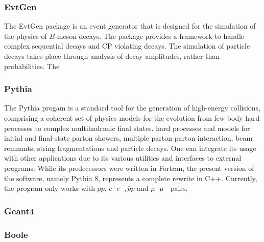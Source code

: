 \subsubsection{EvtGen}
The EvtGen package is an event generator that is designed for the simulation of the physics of $B$-meson decays. The package provides a framework to handle complex sequential decays and CP violating decays. 
The simulation of particle decays takes place through analysis of decay amplitudes, rather than probabilities. The 
\subsubsection{Pythia}
The Pythia progam is a standard tool for the generation of high-energy collisions, comprising a coherent set of physics models for the evolution from few-body hard processes to complex multihadronic final states.
hard processes and models for initial and final-state parton showers, multiple parton-parton interaction, beam remnants, string fragmentations and particle decays.  One can integrate its usage with other applications due to its
various utilities and interfaces to external programs. While its predecessors were written in Fortran, the present version of the software, namely Pythia 8, represents a complete rewrite in C++. Currently, the program 
only works with $pp$, $e^{+}e^{-}, \bar{p}p$ and $ \mu^{+}\mu^{-}$ pairs. 
\subsubsection{Geant4}
\subsubsection{Boole} 



